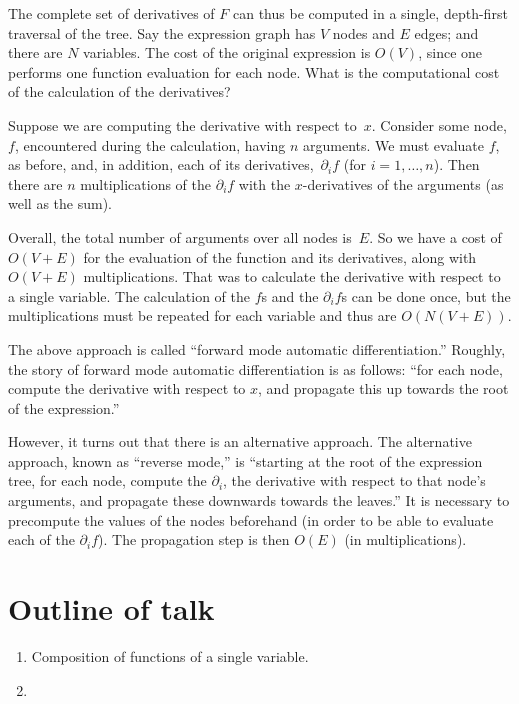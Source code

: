 \documentclass[11pt, a4paper]{article}
\begin{document}
The complete set of derivatives of $F$ can thus be computed in a
single, depth-first traversal of the tree. Say the expression graph
has $V$ nodes and $E$ edges; and there are $N$ variables. The cost of
the original expression is $O(V)$, since one performs one function
evaluation for each node. What is the computational cost of the
calculation of the derivatives?

Suppose we are computing the derivative with respect to~$x$. Consider
some node, $f$, encountered during the calculation, having $n$
arguments. We must evaluate $f$, as before, and, in addition, each of
its derivatives,~$\partial_i f$ (for $i=1,\dotsc,n$). Then there are
$n$ multiplications of the $\partial_i f$ with the $x$-derivatives of the
arguments (as well as the sum).

Overall, the total number of arguments over all nodes is~$E$. So we
have a cost of $O(V+E)$ for the evaluation of the function and its
derivatives, along with $O(V+E)$ multiplications. That was to
calculate the derivative with respect to a single variable. The
calculation of the $f$s and the $\partial_i f$s can be done once, but the
multiplications must be repeated for each variable and thus are
$O(N(V+E))$.

The above approach is called ``forward mode automatic
differentiation.'' Roughly, the story of forward mode automatic
differentiation is as follows: ``for each node, compute the derivative
with respect to $x$, and propagate this up towards the root of the
expression.''

However, it turns out that there is an alternative approach. The
alternative approach, known as ``reverse mode,'' is ``starting at the
root of the expression tree, for each node, compute the $\partial_i$, the
derivative with respect to that node's arguments, and propagate these
downwards towards the leaves.'' It is necessary to precompute the
values of the nodes beforehand (in order to be able to evaluate each
of the $\partial_i f$). The propagation step is then $O(E)$ (in
multiplications). 










\section{Outline of talk}

\begin{enumerate}
\item Composition of functions of a single variable.
\item 
\end{enumerate}
\end{document}
